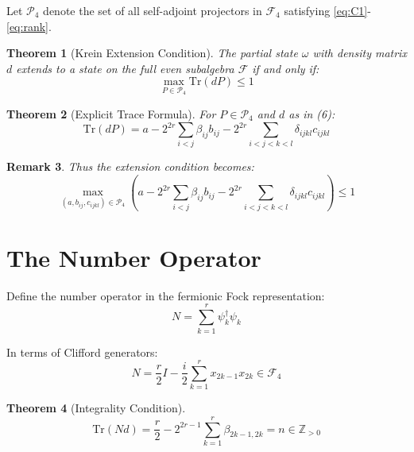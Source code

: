 \documentclass[aps,preprint]{revtex4}
\newtheorem{theorem}{Theorem}
\newtheorem{remark}[theorem]{Remark}
\begin{document}
Let $\mathcal{P}_{4}$ denote the set of all self-adjoint projectors in $%
\mathcal{F}_{4}$ satisfying \eqref{eq:C1}-\eqref{eq:rank}.

\begin{theorem}[Krein Extension Condition]
The partial state $\omega $ with density matrix $d$ extends to a state on
the full even subalgebra $\mathcal{F}$ if and only if: 
\begin{equation}
\max_{P\in \mathcal{P}_{4}}\mathrm{Tr}(dP)\leq 1
\end{equation}
\end{theorem}

\begin{theorem}[Explicit Trace Formula]
For $P \in \mathcal{P}_4$ and $d$ as in (6): 
\begin{equation}
\mathrm{Tr}(dP) = a - 2^{2r}\sum_{i<j}\beta_{ij}b_{ij} -
2^{2r}\sum_{i<j<k<l}\delta_{ijkl}c_{ijkl}
\end{equation}
\end{theorem}

\begin{remark}
Thus the extension condition becomes: 
\begin{equation}
\max_{(a,b_{ij},c_{ijkl})\in \mathcal{P}_{4}}\left( a-2^{2r}\sum_{i<j}\beta
_{ij}b_{ij}-2^{2r}\sum_{i<j<k<l}\delta _{ijkl}c_{ijkl}\right) \leq 1
\end{equation}
\end{remark}

\section{The Number Operator}

Define the number operator in the fermionic Fock representation: 
\begin{equation}
N = \sum_{k=1}^{r} \psi_k^\dagger \psi_k
\end{equation}

In terms of Clifford generators: 
\begin{equation}
N=\frac{r}{2}I-\frac{i}{2}\sum_{k=1}^{r}x_{2k-1}x_{2k}\in \mathcal{F}_{4}
\end{equation}

\begin{theorem}[Integrality Condition]
\begin{equation}
\mathrm{Tr}(Nd) = \frac{r}{2} - 2^{2r-1}\sum_{k=1}^{r} \beta_{2k-1,2k} = n
\in \mathbb{Z}_{>0}
\end{equation}
\end{theorem}
\end{document}
